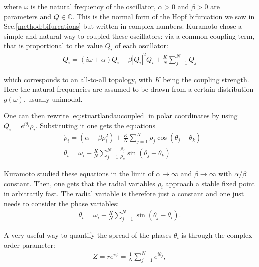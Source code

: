where $\omega$ is the natural frequency of the oscillator, $\alpha>0$ and $\beta>0$ are parameters and $Q \in \mathbb{C}$. This is the normal form of the Hopf bifurcation we saw in Sec.\ref{method:bifurcations} but written in complex numbers. Kuramoto chose a simple and natural way to coupled these oscillators: via a common coupling term, that is proportional to the value $Q_i$ of each oscillator: 
%
\begin{align}
    \dot{Q}_i = (i\omega + \alpha) Q_i - \beta|Q_i|^2 Q_i + \frac{K}{N} \sum_{j=1}^{N} Q_j
    \label{eq:stuartlandaucoupled}
\end{align}

which corresponds to an all-to-all topology, with $K$ being the coupling strength. Here the natural frequencies are assumed to be drawn from a certain distribution $g(\omega)$, usually unimodal.

One can then rewrite \eqref{eq:stuartlandaucoupled} in polar coordinates by using $Q_i = e^{i \theta_i} \rho_i$. Substituting it one gets the equations 
\begin{align}
    &\dot{\rho}_i = (\alpha - \beta \rho_i^2) + \frac{K}{N} \sum_{j=1}^{N} \rho_j \cos(\theta_j - \theta_k) \\
    &\dot{\theta}_i = \omega_i + \frac{K}{N}\sum_{j=1}^{N} \frac{\rho_j}{\rho_k} \sin(\theta_j - \theta_k)
\end{align}

Kuramoto studied these equations in the limit of $\alpha\to\infty$ and $\beta\to\infty$ with $\alpha/\beta$ constant. Then, one gets that the radial variables $\rho_i$ approach a stable fixed point in arbitrarily fast. The radial variable is therefore just a constant and one just needs to consider the phase variables: 
%
\begin{align}
    \theta_i = \omega_i + \frac{K}{N} \sum_{j=1}^{N}\sin(\theta_j-\theta_i).
    \label{eq:kuramoto-og}
\end{align}

A very useful way to quantify the spread of the phases $\theta_i$ is through the complex order parameter:
\begin{align}
    Z = r e^{i\psi} = \frac{1}{N} \sum_{j=1}^{N} e^{i \theta_j},
    \label{eq:kuramoto-order-parameter}
\end{align}

